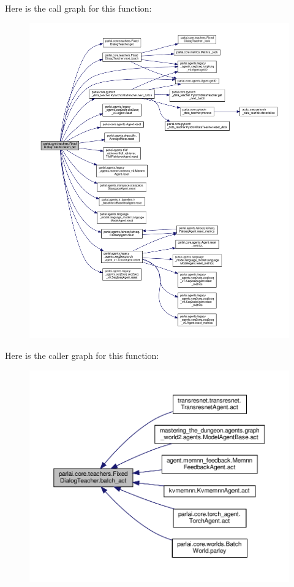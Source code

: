 Here is the call graph for this function\+:
\nopagebreak
\begin{figure}[H]
\begin{center}
\leavevmode
\includegraphics[width=350pt]{classparlai_1_1core_1_1teachers_1_1FixedDialogTeacher_afa75426a7578e8aad5b74964219345be_cgraph}
\end{center}
\end{figure}
Here is the caller graph for this function\+:
\nopagebreak
\begin{figure}[H]
\begin{center}
\leavevmode
\includegraphics[width=350pt]{classparlai_1_1core_1_1teachers_1_1FixedDialogTeacher_afa75426a7578e8aad5b74964219345be_icgraph}
\end{center}
\end{figure}
